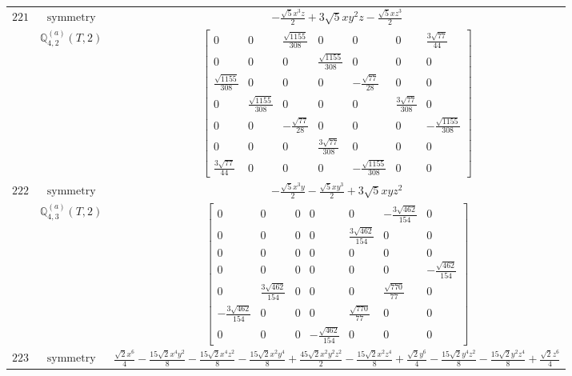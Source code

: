 \documentclass[fleqn,8pt,landscape]{jsarticle}
\begin{document}
\begin{longtable}{ccc}
$ 221 $ & $ \text{symmetry} $ & $ - \frac{\sqrt{5} x^{3} z}{2} + 3 \sqrt{5} x y^{2} z - \frac{\sqrt{5} x z^{3}}{2} $ \\
$  $ & $ \mathbb{Q}_{4,2}^{(a)}(T,2) $ & $ \begin{bmatrix} 0 & 0 & \frac{\sqrt{1155}}{308} & 0 & 0 & 0 & \frac{3 \sqrt{77}}{44} \\ 0 & 0 & 0 & \frac{\sqrt{1155}}{308} & 0 & 0 & 0 \\ \frac{\sqrt{1155}}{308} & 0 & 0 & 0 & - \frac{\sqrt{77}}{28} & 0 & 0 \\ 0 & \frac{\sqrt{1155}}{308} & 0 & 0 & 0 & \frac{3 \sqrt{77}}{308} & 0 \\ 0 & 0 & - \frac{\sqrt{77}}{28} & 0 & 0 & 0 & - \frac{\sqrt{1155}}{308} \\ 0 & 0 & 0 & \frac{3 \sqrt{77}}{308} & 0 & 0 & 0 \\ \frac{3 \sqrt{77}}{44} & 0 & 0 & 0 & - \frac{\sqrt{1155}}{308} & 0 & 0 \end{bmatrix} $ \\ \hline
$ 222 $ & $ \text{symmetry} $ & $ - \frac{\sqrt{5} x^{3} y}{2} - \frac{\sqrt{5} x y^{3}}{2} + 3 \sqrt{5} x y z^{2} $ \\
$  $ & $ \mathbb{Q}_{4,3}^{(a)}(T,2) $ & $ \begin{bmatrix} 0 & 0 & 0 & 0 & 0 & - \frac{3 \sqrt{462}}{154} & 0 \\ 0 & 0 & 0 & 0 & \frac{3 \sqrt{462}}{154} & 0 & 0 \\ 0 & 0 & 0 & 0 & 0 & 0 & 0 \\ 0 & 0 & 0 & 0 & 0 & 0 & - \frac{\sqrt{462}}{154} \\ 0 & \frac{3 \sqrt{462}}{154} & 0 & 0 & 0 & \frac{\sqrt{770}}{77} & 0 \\ - \frac{3 \sqrt{462}}{154} & 0 & 0 & 0 & \frac{\sqrt{770}}{77} & 0 & 0 \\ 0 & 0 & 0 & - \frac{\sqrt{462}}{154} & 0 & 0 & 0 \end{bmatrix} $ \\ \hline
$ 223 $ & $ \text{symmetry} $ & $ \frac{\sqrt{2} x^{6}}{4} - \frac{15 \sqrt{2} x^{4} y^{2}}{8} - \frac{15 \sqrt{2} x^{4} z^{2}}{8} - \frac{15 \sqrt{2} x^{2} y^{4}}{8} + \frac{45 \sqrt{2} x^{2} y^{2} z^{2}}{2} - \frac{15 \sqrt{2} x^{2} z^{4}}{8} + \frac{\sqrt{2} y^{6}}{4} - \frac{15 \sqrt{2} y^{4} z^{2}}{8} - \frac{15 \sqrt{2} y^{2} z^{4}}{8} + \frac{\sqrt{2} z^{6}}{4} $ \\

\end{longtable}
\end{document}

